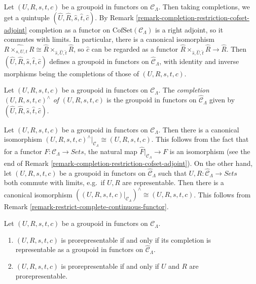 \noindent
Let $(U,R,s,t,c)$ be a groupoid in functors on $\mathcal{C}_\Lambda$.  Then 
taking completions, we get a quintuple $(\widehat{U}, \widehat{R}, \widehat{s}, 
\widehat{t}, \widehat{c})$.  By Remark 
\ref{remark-completion-restriction-cofset-adjoint} completion as a functor on 
$\text{CofSet}(\mathcal{C}_\Lambda)$ is a right adjoint, so it commutes 
with limits.  In particular, there is a canonical isomorphism $\widehat{R 
\times_{s,U,t} R} \cong \widehat{R} \times_{\widehat{s}, \widehat{U}, 
\widehat{t}} \widehat{R}$, so $\widehat{c}$ can be regarded as a functor 
$\widehat{R} \times_{\widehat{s}, \widehat{U}, \widehat{t}} \widehat{R} 
\to \widehat{R}$.  Then $(\widehat{U}, \widehat{R}, \widehat{s}, 
\widehat{t}, \widehat{c})$ defines a groupoid in functors on $\widehat{\mathcal 
C}_\Lambda$, with identity and inverse morphisms being the completions of 
those of $(U,R,s,t,c)$.

\begin{definition}
\label{definition-completion-groupoud-in-functors}
Let $(U,R,s,t,c)$ be a groupoid in functors on $\mathcal{C}_\Lambda$.  The 
{\it completion $(U,R,s,t,c)^{\wedge}$ of $(U,R,s,t,c)$} is the groupoid in 
functors on $\widehat{\mathcal{C}}_\Lambda$ given by 
$(\widehat{U},\widehat{R},\widehat{s},\widehat{t},\widehat{c})$.
\end{definition}

\begin{remark}
\label{remark-groupoid-in-functors-complete-restrict}
Let $(U,R,s,t,c)$ be a groupoid in functors on $\mathcal{C}_\Lambda$. Then 
there is a canonical isomorphism $(U,R,s,t,c)^{\wedge}|_{\mathcal{C}_\Lambda} 
\cong (U,R,s,t,c)$.  This follows from the fact that for a functor $F: \mathcal 
C_\Lambda \to \textit{Sets}$, the natural map 
$\widehat{F}|_{\mathcal{C}_\Lambda} \to F$ is an isomorphism (see the 
end of Remark \ref{remark-completion-restriction-cofset-adjoint}).  On the 
other hand, let $(U,R,s,t,c)$ be a groupoid in functors on $\widehat{\mathcal 
C}_\Lambda$ such that $U, R: \widehat{\mathcal{C}}_\Lambda \to 
\textit{Sets}$ both commute with limits, e.g.\ if $U,R$ are 
representable. Then there is a canonical isomorphism $((U,R,s,t,c)|_{\mathcal 
C_\Lambda})^{\wedge} \cong (U,R,s,t,c)$. This follows from Remark 
\ref{remark-restrict-complete-continuous-functor}.
\end{remark}

\begin{lemma}
\label{lemma-groupoid-in-functors-prorep-equivalences}
Let $(U,R,s,t,c)$ be a groupoid in functors on $\mathcal{C}_\Lambda$.
\begin{enumerate}
\item $(U,R,s,t,c)$ is prorepresentable if and only if its completion is 
representable as a groupoid in functors on $\widehat{\mathcal{C}}_\Lambda$.
\item $(U,R,s,t,c)$ is prorepresentable if and only if $U$ and $R$ are 
prorepresentable.
\end{enumerate}
\end{lemma}

